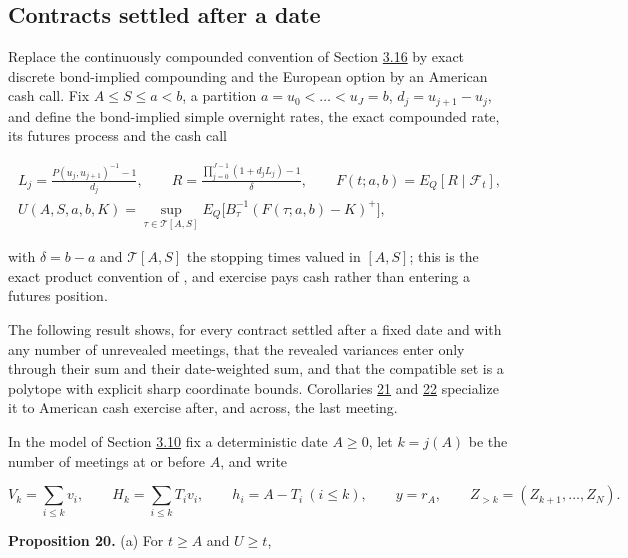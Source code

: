 \documentclass[11pt]{article}
\begin{document}
\subsection{Contracts settled after a date}\label{sec:3.17}

Replace the continuously compounded convention of Section \hyperref[sec:3.16]{3.16} by exact discrete bond-implied compounding and the European option by an American cash call. Fix \(A \le S \le a < b\), a partition \(a = u_0 < \dots < u_J = b\), \(d_j = u_{j+1} - u_j\), and define the bond-implied simple overnight rates, the exact compounded rate, its futures process and the cash call

\begin{equation*}
\begin{gathered}
L_j = \frac{P(u_j, u_{j+1})^{-1} - 1}{d_j}, \qquad R = \frac{\prod_{j=0}^{J-1} (1 + d_j L_j) - 1}{\delta}, \qquad F(t; a, b) = E_Q[R \mid \mathcal F_t], \\
U(A, S, a, b, K) = \sup_{\tau \in \mathcal T[A, S]} E_Q\bigl[ B_\tau^{-1} (F(\tau; a, b) - K)^+ \bigr],
\end{gathered} \tag{3.76}\label{eq:3.76}
\end{equation*}

with \(\delta = b - a\) and \(\mathcal T[A, S]\) the stopping times valued in \([A, S]\); this is the exact product convention of \cite{skov2021dynamic}, and exercise pays cash rather than entering a futures position.

The following result shows, for every contract settled after a fixed date and with any number of unrevealed meetings, that the revealed variances enter only through their sum and their date-weighted sum, and that the compatible set is a polytope with explicit sharp coordinate bounds. Corollaries \hyperref[res:Corollary-21]{21} and \hyperref[res:Corollary-22]{22} specialize it to American cash exercise after, and across, the last meeting.

In the model of Section \hyperref[sec:3.10]{3.10} fix a deterministic date \(A \ge 0\), let \(k = j(A)\) be the number of meetings at or before \(A\), and write

\begin{equation*}
V_k = \sum_{i \le k} v_i, \qquad H_k = \sum_{i \le k} T_i v_i, \qquad h_i = A - T_i \ (i \le k), \qquad y = r_A, \qquad Z_{>k} = (Z_{k+1}, \dots, Z_N). \tag{3.77}\label{eq:3.77}
\end{equation*}

\label{res:Proposition-20}
\textbf{Proposition 20.} (a) For \(t \ge A\) and \(U \ge t\),
\end{document}
